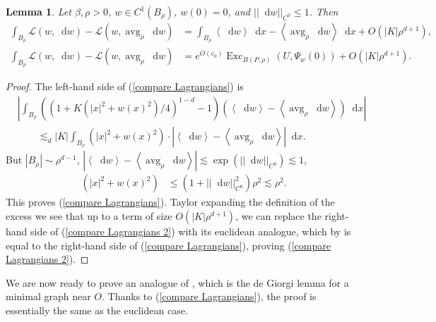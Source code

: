 \documentclass[reqno,10pt]{amsart}
\DeclareMathOperator{\avg}{avg}
\DeclareMathOperator{\Exc}{Exc}
\newcommand*\dif{\mathop{}\!\mathrm{d}}
\newcommand{\Lagrange}{\mathscr L}
\def\Japan#1{\left \langle #1 \right \rangle}
\newtheorem{lemma}[theorem]{Lemma}
\theoremstyle{definition}
\numberwithin{equation}{section}
\begin{document}
\begin{lemma}
Let $\beta, \rho > 0$, $w \in C^1(B_\rho)$, $w(0) = 0$, and $||\dif w||_{C^0} \leq 1$. Then
\begin{align}
\int_{B_\rho} \Lagrange(w, \dif w) - \Lagrange(w, \avg_\rho \dif w) &= \int_{B_\rho} \Japan{\dif w} \dif x - \Japan{\avg_\rho \dif w} \dif x + O(|K| \rho^{d + 1}) \label{compare Lagrangians}, \\
\int_{B_\rho} \Lagrange(w, \dif w) - \Lagrange(w, \avg_\rho \dif w) &= e^{O(c_0)} \Exc_{B(P, \rho)} (U, \Psi_w(0)) + O(|K| \rho^{d + 1}). \label{compare Lagrangians 2}
\end{align}
\end{lemma}
\begin{proof}
The left-hand side of (\ref{compare Lagrangians}) is
\begin{align*}
&\left|\int_{B_\rho} ((1 + K(|x|^2 + w(x)^2)/4)^{1 - d} - 1)(\Japan{\dif w} - \Japan{\avg_\rho \dif w}) \dif x\right| \\
&\qquad \lesssim_d |K| \int_{B_\rho} (|x|^2 + w(x)^2) \cdot \left|\Japan{\dif w} - \Japan{\avg_\rho \dif w}\right| \dif x.
\end{align*}
But $|B_\rho| \sim \rho^{d - 1}$, $|\Japan{\dif w} - \Japan{\avg_\rho \dif w}| \lesssim \exp(||\dif w||_{C^0}) \lesssim 1$,
\begin{align*}
(|x|^2 + w(x)^2) &\leq (1 + ||\dif w||_{C^0}^2) \rho^2 \lesssim \rho^2.
\end{align*}
This proves (\ref{compare Lagrangians}). Taylor expanding the definition of the excess we see that up to a term of size $O(|K| \rho^{d + 1})$, we can replace the right-hand side of (\ref{compare Lagrangians 2}) with its euclidean analogue, which by \cite[pg83]{Giusti77} is equal to the right-hand side of (\ref{compare Lagrangians}), proving (\ref{compare Lagrangians 2}).
\end{proof}

We are now ready to prove an analogue of \cite[Lemma 4.3]{Miranda66}, which is the de Giorgi lemma for a minimal graph near $O$.
Thanks to (\ref{compare Lagrangians}), the proof is essentially the same as the euclidean case.
\end{document}

